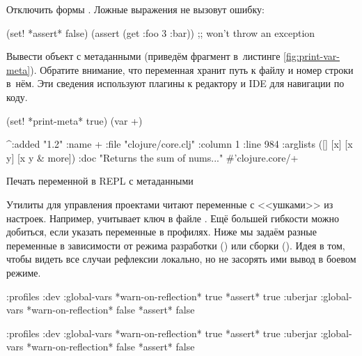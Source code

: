 \fi

Отключить формы . Ложные выражения не вызовут ошибку:

\begin{clojure}
(set! *assert* false)
(assert (get {:foo 3} :bar))
;; won't throw an exception
\end{clojure}

Вывести объект с метаданными (приведём фрагмент в~листинге
\ref{fig:print-var-meta}). Обратите внимание, что переменная хранит путь к файлу
и номер строки в~нём. Эти сведения используют плагины к редактору и IDE для
навигации по коду.

\begin{listing}[ht!]

\begin{clojure}
(set! *print-meta* true)
(var +)

^{:added "1.2"
  :name +
  :file "clojure/core.clj"
  :column 1
  :line 984
  :arglists ([] [x] [x y] [x y & more])
  :doc "Returns the sum of nums..."}
#'clojure.core/+
\end{clojure}

\caption{Печать переменной в REPL с метаданными}
\label{fig:print-var-meta}

\end{listing}


Утилиты для управления проектами читают переменные с <<ушками>> из
настроек. Например,  учитывает ключ  в файле
. Ещё большей гибкости можно добиться, если указать переменные
в профилях. Ниже мы задаём разные переменные в зависимости от режима разработки
() или сборки (). Идея в том, чтобы видеть все случаи
рефлексии локально, но не засорять ими вывод в боевом режиме.

\ifnarrow

\begin{clojure}
{:profiles
 :dev {:global-vars
       {*warn-on-reflection* true
        *assert* true}}
 :uberjar {:global-vars
           {*warn-on-reflection* false
            *assert* false}}}
\end{clojure}

\else

\begin{clojure}
{:profiles
 :dev {:global-vars {*warn-on-reflection* true
                     *assert* true}}
 :uberjar {:global-vars {*warn-on-reflection* false
                         *assert* false}}}
\end{clojure}

